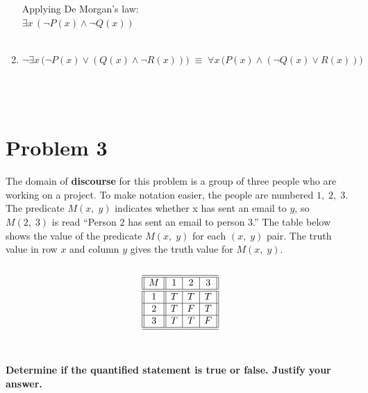 \documentclass{amsart}
\theoremstyle{definition}
\theoremstyle{Exercise}
\theoremstyle{remark}
\theoremstyle{rule}
\numberwithin{equation}{section}
\begin{document}
\begin{enumerate}[label=(\alph*)]
Applying De Morgan's law:\\
$\exists x \, \left(\neg P(x) \land \neg Q(x) \right)$\\\\

\item $\neg \exists x \, \big(\neg P(x) \lor \left(Q(x) \land \neg R(x) \right)\big)\; \equiv \; \forall x \,\big( P(x) \land \left( \neg Q(x) \lor R(x) \right)\big)$\\\\
\\\\
\end{enumerate}


\newpage




\section*{Problem 3}

The domain of {\bf discourse} for this problem is a group of three people who are working on a project. To make notation easier, the people are numbered $1, \;2, \;3$. The predicate $M(x,\; y)$ indicates whether x has sent an email to $y$, so $M(2, \;3)$ is read ``Person $2$ has sent an email to person $3$.'' The table below shows the value of the predicate $M(x,\;y)$ for each $(x,\;y)$ pair. The truth value in row $x$ and column $y$ gives the truth value for $M(x,\;y)$.\\\\
\[
 \begin{array}{||c||c|c|c||}
\hline\hline
M & 1 & 2& 3\\
\hline\hline
1 &T & T & T\\
\hline
2 &T & F & T\\
\hline
3 &T & T & F\\
\hline\hline
    \end{array}
    \]\\\\
{\bf Determine if the quantified statement is true or false. Justify your answer.}\\
\end{document}

